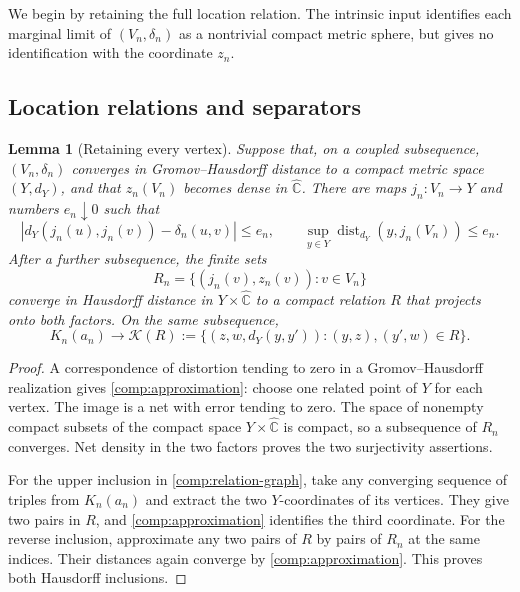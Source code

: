 \documentclass[11pt]{article}
\numberwithin{equation}{section}
\newtheorem{lemma}[theorem]{Lemma}
\theoremstyle{definition}
\theoremstyle{remark}
\newcommand{\1}{\mathbf 1}
\begin{document}
We begin by retaining the full location relation.  The intrinsic
input identifies each marginal limit of $(V_n,\delta_n)$ as a
nontrivial compact metric sphere, but gives no identification with
the coordinate $z_n$.

\subsection{Location relations and separators}

\begin{lemma}[Retaining every vertex]
\label{comp:relation}
Suppose that, on a coupled subsequence,
$(V_n,\delta_n)$ converges in Gromov--Hausdorff distance to a compact
metric space $(Y,d_Y)$, and that $z_n(V_n)$ becomes dense in $\widehat{\mathbb C}$.
There are maps $j_n:V_n\to Y$ and numbers $e_n\downarrow0$ such that
\begin{equation}
 \label{comp:approximation}
 \left|d_Y(j_n(u),j_n(v))-\delta_n(u,v)\right|\le e_n,
 \qquad
 \sup_{y\in Y}\operatorname{dist}_{d_Y}(y,j_n(V_n))\le e_n.
\end{equation}
After a further subsequence, the finite sets
\[
 R_n=\{(j_n(v),z_n(v)):v\in V_n\}
\]
converge in Hausdorff distance in $Y\times\widehat{\mathbb C}$ to a compact relation
$R$ that projects onto both factors.  On the same subsequence,
\begin{equation}
 \label{comp:relation-graph}
 K_n(a_n)\longrightarrow
 \mathcal K(R):=
 \{(z,w,d_Y(y,y')):(y,z),(y',w)\in R\}.
\end{equation}
\end{lemma}

\begin{proof}
A correspondence of distortion tending to zero in a
Gromov--Hausdorff realization gives \eqref{comp:approximation}: choose
one related point of $Y$ for each vertex.  The image is a net with
error tending to zero.  The space of nonempty compact subsets of the
compact space $Y\times\widehat{\mathbb C}$ is compact, so a subsequence of $R_n$
converges.  Net density in the two factors proves the two surjectivity
assertions.

For the upper inclusion in \eqref{comp:relation-graph}, take any
converging sequence of triples from $K_n(a_n)$ and extract the two
$Y$-coordinates of its vertices.  They give two pairs in $R$, and
\eqref{comp:approximation} identifies the third coordinate.  For the
reverse inclusion, approximate any two pairs of $R$ by pairs of $R_n$
at the same indices.  Their distances again converge by
\eqref{comp:approximation}.  This proves both Hausdorff inclusions.
\end{proof}
\end{document}
